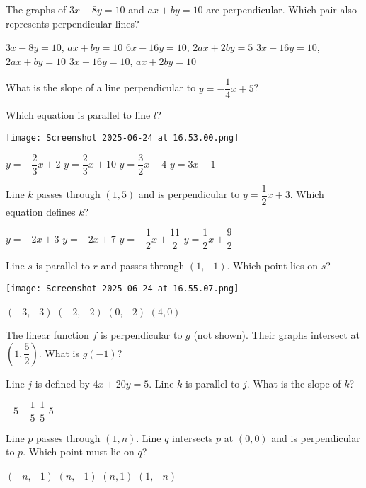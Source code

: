 \documentclass[12pt]{exam}
\begin{document}
\begin{questions}
\question The graphs of $3x + 8y = 10$ and $ax + by = 10$ are perpendicular. Which pair also represents perpendicular lines?
\begin{choices}
\choice $3x - 8y = 10$, $ax + by = 10$
\choice $6x - 16y = 10$, $2ax + 2by = 5$
\choice $3x + 16y = 10$, $2ax + by = 10$
\choice $3x + 16y = 10$, $ax + 2by = 10$
\end{choices}

\question What is the slope of a line perpendicular to $y = -\dfrac{1}{4}x + 5$?

\question Which equation is parallel to line $l$?
\begin{center}
\texttt{[image: Screenshot 2025-06-24 at 16.53.00.png]}
\end{center}
\begin{choices}
\choice $y = -\dfrac{2}{3}x + 2$
\choice $y = \dfrac{2}{3}x + 10$
\choice $y = \dfrac{3}{2}x - 4$
\choice $y = 3x - 1$
\end{choices}

\question Line $k$ passes through $(1,5)$ and is perpendicular to $y = \dfrac{1}{2}x + 3$. Which equation defines $k$?
\begin{choices}
\choice $y = -2x + 3$
\choice $y = -2x + 7$
\choice $y = -\dfrac{1}{2}x + \dfrac{11}{2}$
\choice $y = \dfrac{1}{2}x + \dfrac{9}{2}$
\end{choices}

\question Line $s$ is parallel to $r$ and passes through $(1,-1)$. Which point lies on $s$?
\begin{center}
\texttt{[image: Screenshot 2025-06-24 at 16.55.07.png]}
\end{center}
\begin{choices}
\choice $(-3,-3)$
\choice $(-2,-2)$
\choice $(0,-2)$
\choice $(4,0)$
\end{choices}

\question The linear function $f$ is perpendicular to $g$ (not shown). Their graphs intersect at $\left(1,\dfrac{5}{2}\right)$. What is $g(-1)$?

\question Line $j$ is defined by $4x + 20y = 5$. Line $k$ is parallel to $j$. What is the slope of $k$?
\begin{choices}
\choice $-5$
\choice $-\dfrac{1}{5}$
\choice $\dfrac{1}{5}$
\choice $5$
\end{choices}

\question Line $p$ passes through $(1,n)$. Line $q$ intersects $p$ at $(0,0)$ and is perpendicular to $p$. Which point must lie on $q$?
\begin{choices}
\choice $(-n,-1)$
\choice $(n,-1)$
\choice $(n,1)$
\choice $(1,-n)$
\end{choices}


\end{questions}
\end{document}
